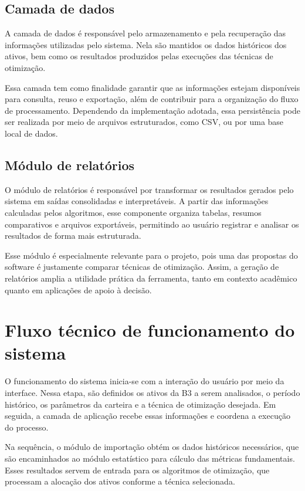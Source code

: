 \documentclass[
	12pt,				%
	openright,			%
	oneside,			    %
	a4paper,				%
	english,			%
	french,			%
	spanish,			%
	brazil			%
	]{abntex2}
\begin{document}
\subsection{Camada de dados}

A camada de dados é responsável pelo armazenamento e pela recuperação das informações utilizadas pelo sistema. Nela são mantidos os dados históricos dos ativos, bem como os resultados produzidos pelas execuções das técnicas de otimização.

Essa camada tem como finalidade garantir que as informações estejam disponíveis para consulta, reuso e exportação, além de contribuir para a organização do fluxo de processamento. Dependendo da implementação adotada, essa persistência pode ser realizada por meio de arquivos estruturados, como CSV, ou por uma base local de dados.

\subsection{Módulo de relatórios}

O módulo de relatórios é responsável por transformar os resultados gerados pelo sistema em saídas consolidadas e interpretáveis. A partir das informações calculadas pelos algoritmos, esse componente organiza tabelas, resumos comparativos e arquivos exportáveis, permitindo ao usuário registrar e analisar os resultados de forma mais estruturada.

Esse módulo é especialmente relevante para o projeto, pois uma das propostas do software é justamente comparar técnicas de otimização. Assim, a geração de relatórios amplia a utilidade prática da ferramenta, tanto em contexto acadêmico quanto em aplicações de apoio à decisão.

\section{Fluxo técnico de funcionamento do sistema}

O funcionamento do sistema inicia-se com a interação do usuário por meio da interface. Nessa etapa, são definidos os ativos da B3 a serem analisados, o período histórico, os parâmetros da carteira e a técnica de otimização desejada. Em seguida, a camada de aplicação recebe essas informações e coordena a execução do processo.

Na sequência, o módulo de importação obtém os dados históricos necessários, que são encaminhados ao módulo estatístico para cálculo das métricas fundamentais. Esses resultados servem de entrada para os algoritmos de otimização, que processam a alocação dos ativos conforme a técnica selecionada.
\end{document}
